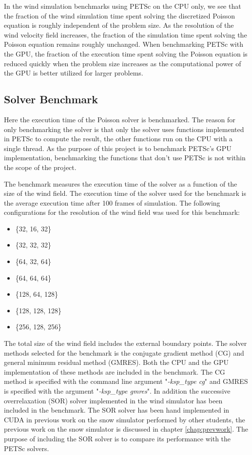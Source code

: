 In the wind simulation benchmarks using PETSc on the CPU only, we see that the
fraction of the wind simulation time spent solving the discretized Poisson
equation is roughly independent of the problem size. As the resolution of the
wind velocity field increases, the fraction of the simulation time spent solving
the Poisson equation remains roughly unchanged. When benchmarking PETSc with the
GPU, the fraction of the execution time spent solving the Poisson equation is
reduced quickly when the problem size increases as the computational power of the
GPU is better utilized for larger problems.

\subsection{Solver Benchmark}

Here the execution time of the Poisson solver is benchmarked. The reason for
only benchmarking the solver is that only the solver uses functions implemented
in PETSc to compute the result, the other functions run on the CPU with a single
thread. As the purpose of this project is to benchmark PETSc's GPU
implementation, benchmarking the functions that don't use PETSc is not within
the scope of the project.

The benchmark measures the execution time of the solver as a function of the
size of the wind field. The execution time of the solver used for the benchmark
is the average execution time after 100 frames of simulation. The following
configurations for the resolution of the wind field was used for this benchmark:

\begin{itemize}
	\item \{32, 16, 32\}
	\item \{32, 32, 32\}
	\item \{64, 32, 64\}
	\item \{64, 64, 64\}
	\item \{128, 64, 128\}
	\item \{128, 128, 128\}
	\item \{256, 128, 256\}
\end{itemize}

The total size of the wind field includes the external boundary points. The
solver methods selected for the benchmark is the conjugate gradient method (CG)
and general minimum residual method (GMRES). Both the CPU and the GPU
implementation of these methods are included in the benchmark. The CG method is
specified with the command line argument "\emph{-ksp\_type cg}" and GMRES is
specified with the argument "\emph{-ksp\_type gmres}". In addition the
successive overrelaxation (SOR) solver implemented in the wind simulator has
been included in the benchmark. The SOR solver has been hand implemented in
CUDA in previous work on the snow simulator performed by other students, the
previous work on the snow simulator is discussed in chapter \ref{chap:prevwork}.
The purpose of including the SOR solver is to compare its performance with the
PETSc solvers.

